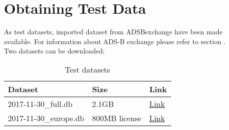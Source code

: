 \section{Obtaining Test Data}
\label{sec:test_data} 

As test datasets, imported dataset from ADSBexchange have been made available. For information about ADS-B exchange please refer to section . \\

Two datasets can be downloaded:

\begin{table}[H]
  \center
  \begin{tabular}{ | l | l | l |}
    \hline
    \textbf{Dataset} & Size & \textbf{Link} \\ \hline
    2017-11-30\_full.db & 2.1GB & \href{https://doc.qt.io/qt-5.10/licensing.html}{Link} \\ \hline
    2017-11-30\_europe.db & 800MB license  & \href{https://www.boost.org/users/license.html}{Link} \\
    \hline
  \end{tabular}
  \caption{Test datasets}
\end{table}

